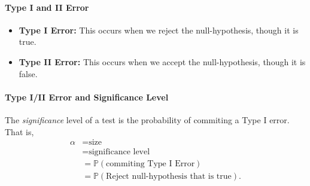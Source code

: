 \paragraph{Type I and II Error}
\begin{itemize}
  \item \textbf{Type I Error:} This occurs when we reject the null-hypothesis, though it is true.
  \item \textbf{Type II Error:} This occurs when we accept the null-hypothesis, though it is false.
\end{itemize}

\paragraph{Type I/II Error and Significance Level}
The \textit{significance} level of a test is the probability of commiting a 
Type I error. That is,
\begin{align*}
  \alpha &= \text{size} \\
         &= \text{significance level} \\
         &= \mathbb{P}(\text{commiting Type I Error}) \\
         &= \mathbb{P}(\text{Reject null-hypothesis that is true})
.\end{align*}



